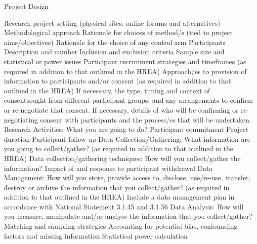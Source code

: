 Project Design

Research project setting (physical sites, online forums and alternatives)
Methodological approach
Rationale for choices of method/s (tied to project aims/objectives)
Rationale for the choice of any control arm
Participants
Description and number
Inclusion and exclusion criteria
Sample size and statistical or power issues
Participant recruitment strategies and timeframes (as required in addition to that outlined in the HREA)
Approach/es to provision of information to participants and/or consent (as required in addition to that outlined in the HREA)
If necessary, the type, timing and context of consentsought from different participant groups, and any arrangements to confirm or re-negotiate that consent.
If necessary, details of who will be confirming or re-negotiating consent with participants and the process/es that will be undertaken.
Research Activities: What you are going to do?
Participant commitment
Project duration
Participant follow-up
Data Collection/Gathering: What information are you going to collect/gather? (as required in addition to that outlined in the HREA)
Data collection/gathering techniques: How will you collect/gather the information?
Impact of and response to participant withdrawal
Data Management: How will you store, provide access to, disclose, use/re-use, transfer, destroy or archive the information that you collect/gather? (as required in addition to that outlined in the HREA)
Include a data management plan in accordance with National Statement 3.1.45 and 3.1.56
Data Analysis: How will you measure, manipulate and/or analyse the information that you collect/gather?
Matching and sampling strategies
Accounting for potential bias, confounding factors and missing information
Statistical power calculation